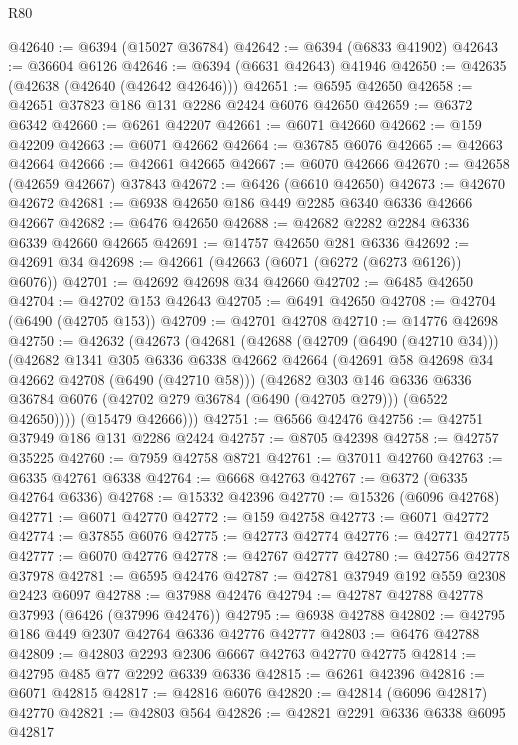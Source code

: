 \begin{lexlean}{R80}
\begin{coremodule}
@42640 := @6394 (@15027 @36784)
@42642 := @6394 (@6833 @41902)
@42643 := @36604 @6126
@42646 := @6394 (@6631 @42643) @41946
@42650 := @42635 (@42638 (@42640 (@42642 @42646)))
@42651 := @6595 @42650
@42658 := @42651 @37823 @186 @131 @2286 @2424 @6076 @42650
@42659 := @6372 @6342
@42660 := @6261 @42207
@42661 := @6071 @42660
@42662 := @159 @42209
@42663 := @6071 @42662
@42664 := @36785 @6076
@42665 := @42663 @42664
@42666 := @42661 @42665
@42667 := @6070 @42666
@42670 := @42658 (@42659 @42667) @37843
@42672 := @6426 (@6610 @42650)
@42673 := @42670 @42672
@42681 := @6938 @42650 @186 @449 @2285 @6340 @6336 @42666 @42667
@42682 := @6476 @42650
@42688 := @42682 @2282 @2284 @6336 @6339 @42660 @42665
@42691 := @14757 @42650 @281 @6336
@42692 := @42691 @34
@42698 := @42661 (@42663 (@6071 (@6272 (@6273 @6126)) @6076))
@42701 := @42692 @42698 @34 @42660
@42702 := @6485 @42650
@42704 := @42702 @153 @42643
@42705 := @6491 @42650
@42708 := @42704 (@6490 (@42705 @153))
@42709 := @42701 @42708
@42710 := @14776 @42698
@42750 := @42632
    (@42673
      (@42681
        (@42688
          (@42709 (@6490 (@42710 @34)))
          (@42682
            @1341
            @305
            @6336
            @6338
            @42662
            @42664
            (@42691 @58 @42698 @34 @42662 @42708 (@6490 (@42710 @58)))
            (@42682
              @303
              @146
              @6336
              @6336
              @36784
              @6076
              (@42702 @279 @36784 (@6490 (@42705 @279)))
              (@6522 @42650))))
        (@15479 @42666)))
@42751 := @6566 @42476
@42756 := @42751 @37949 @186 @131 @2286 @2424
@42757 := @8705 @42398
@42758 := @42757 @35225
@42760 := @7959 @42758 @8721
@42761 := @37011 @42760
@42763 := @6335 @42761 @6338
@42764 := @6668 @42763
@42767 := @6372 (@6335 @42764 @6336)
@42768 := @15332 @42396
@42770 := @15326 (@6096 @42768)
@42771 := @6071 @42770
@42772 := @159 @42758
@42773 := @6071 @42772
@42774 := @37855 @6076
@42775 := @42773 @42774
@42776 := @42771 @42775
@42777 := @6070 @42776
@42778 := @42767 @42777
@42780 := @42756 @42778 @37978
@42781 := @6595 @42476
@42787 := @42781 @37949 @192 @559 @2308 @2423 @6097
@42788 := @37988 @42476
@42794 := @42787 @42788 @42778 @37993 (@6426 (@37996 @42476))
@42795 := @6938 @42788
@42802 := @42795 @186 @449 @2307 @42764 @6336 @42776 @42777
@42803 := @6476 @42788
@42809 := @42803 @2293 @2306 @6667 @42763 @42770 @42775
@42814 := @42795 @485 @77 @2292 @6339 @6336
@42815 := @6261 @42396
@42816 := @6071 @42815
@42817 := @42816 @6076
@42820 := @42814 (@6096 @42817) @42770
@42821 := @42803 @564
@42826 := @42821 @2291 @6336 @6338 @6095 @42817

\end{coremodule}
\end{lexlean}

